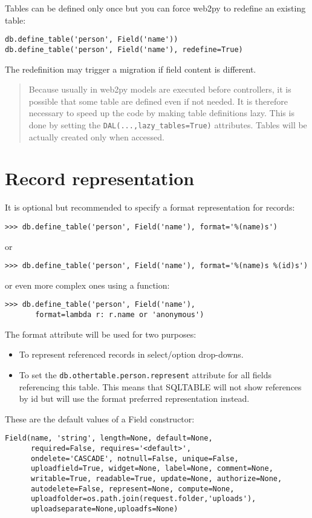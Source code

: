 \documentclass[justified,sixbynine,notoc]{tufte-book}
\def\ft{\small\tt}
\def\inxx#1{\index{#1}}
\begin{document}
\begin{fullwidth}
Tables can be defined only once but you can force web2py to redefine an existing table:

\begin{lstlisting}
db.define_table('person', Field('name'))
db.define_table('person', Field('name'), redefine=True)
\end{lstlisting}

The redefinition may trigger a migration if field content is different.

\begin{quote}Because usually in web2py models are executed before controllers, it is possible that some table are defined even if not needed. It is therefore necessary to speed up the code by making table definitions lazy. This is done by setting the {\ft DAL(...,lazy\_tables=True)} attributes. Tables will be actually created only when accessed.\end{quote}
\goodbreak\section{Record representation}

It is optional but recommended to specify a format representation for records:
\begin{lstlisting}
>>> db.define_table('person', Field('name'), format='%(name)s')
\end{lstlisting}
\noindent or
\begin{lstlisting}
>>> db.define_table('person', Field('name'), format='%(name)s %(id)s')
\end{lstlisting}
\noindent or even more complex ones using a function:
\begin{lstlisting}
>>> db.define_table('person', Field('name'),
       format=lambda r: r.name or 'anonymous')
\end{lstlisting}

The format attribute will be used for two purposes:
\begin{itemize}
\item To represent referenced records in select/option drop-downs.

\item To set the {\ft db.othertable.person.represent} attribute for all fields referencing this table. This means that SQLTABLE will not show references by id but will use the format preferred representation instead.
\end{itemize}

\inxx{Field constructor}
These are the default values of a Field constructor:
\begin{lstlisting}
Field(name, 'string', length=None, default=None,
      required=False, requires='<default>',
      ondelete='CASCADE', notnull=False, unique=False,
      uploadfield=True, widget=None, label=None, comment=None,
      writable=True, readable=True, update=None, authorize=None,
      autodelete=False, represent=None, compute=None,
      uploadfolder=os.path.join(request.folder,'uploads'),
      uploadseparate=None,uploadfs=None)
\end{lstlisting}


\end{fullwidth}
\end{document}
